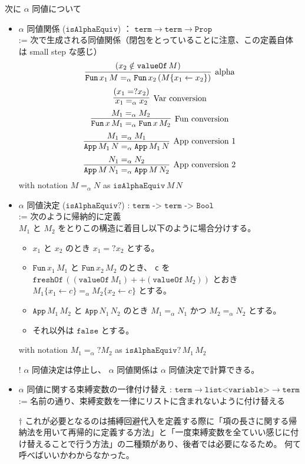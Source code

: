 \documentclass[dvipdfmx]{jsarticle}
\begin{document}
次に \(\alpha\) 同値について
\begin{itemize}
  \item \(\alpha\) 同値関係 (\(\texttt{isAlphaEquiv}\)) ： \(\texttt{term} \to \texttt{term} \to \texttt{Prop}\) \\
    := 次で生成される同値関係（閉包をとっていることに注意、この定義自体は small step な感じ）
      \[\infer[\text{alpha}]{\texttt{Fun} \, x_1 \, M =_{\alpha} \texttt{Fun} \, x_2 \, (M\{x_1 \leftarrow x_2\})}{(x_2 \notin \texttt{valueOf} \, M)}\]
      \[\infer[\text{Var conversion}]{x_1 =_{\alpha} x_2}{(x_1 =? x_2)}\]
      \[\infer[\text{Fun conversion}]{\texttt{Fun} \, x \, M_1 =_{\alpha} \texttt{Fun} \, x \, M_2}{M_1 =_{\alpha} M_2}\]
      \[\infer[\text{App conversion 1}]{\texttt{App} \, M_1 \, N =_{\alpha} \texttt{App} \, M_1 \, N}{M_1 =_{\alpha} M_1}\]
      \[\infer[\text{App conversion 2}]{\texttt{App} \, M \, N_1 =_{\alpha} \texttt{App} \, M \, N_2}{N_1 =_{\alpha} N_2}\]
    with notation \(M =_{\alpha} N\) as \(\texttt{isAlphaEquiv} \, M \, N\)
  \item \(\alpha\) 同値決定 (\(\texttt{isAlphaEquiv?}\)) : \(\texttt{term -> term -> Bool}\) \\
    := 次のように帰納的に定義 \\
      \(M_1\) と \(M_2\) をとりこの構造に着目し以下のように場合分けする。
      \begin{itemize}
        \item \(x_1\) と \(x_2\) のとき \(x_1 =? x_2\) とする。
        \item \(\texttt{Fun} \, x_1 \, M_1\) と \(\texttt{Fun} \, x_2 \, M_2\) のとき、
          \texttt{c} を \(\texttt{freshOf} \, ((\texttt{valueOf} \, M_1) ++ (\texttt{valueOf} \, M_2))\) とおき \\
          \(M_1 \{x_1 \leftarrow c\} =_{\alpha} M_2 \{x_2 \leftarrow c\}\) とする。
        \item \(\texttt{App} \, M_1 \, M_2\) と \(\texttt{App} \, N_1 \, N_2\) のとき
          \(M_1 =_{\alpha} N_1\) かつ \(M_2 =_{\alpha} N_2\) とする。
        \item それ以外は \(\texttt{false}\) とする。
      \end{itemize}
    with notation \(M_1 =_{\alpha}? M_2\) as \(\texttt{isAlphaEquiv?} \, M_1 \, M_2\)
  \item[!] \(\alpha\) 同値決定は停止し、 \(\alpha\) 同値関係は \(\alpha\) 同値決定で計算できる。
  \item \(\alpha\) 同値に関する束縛変数の一律付け替え : \(\texttt{term} \to \texttt{list<variable>} \to \texttt{term}\) \\
    := 名前の通り、束縛変数を一律にリストに含まれないように付け替える
  \item[\(\dagger\)]これが必要となるのは捕縛回避代入を定義する際に「項の長さに関する帰納法を用いて再帰的に定義する方法」と「一度束縛変数を全ていい感じに付け替えることで行う方法」の二種類があり、後者では必要になるため。
    何て呼べばいいかわからなかった。
\end{itemize}
\end{document}
